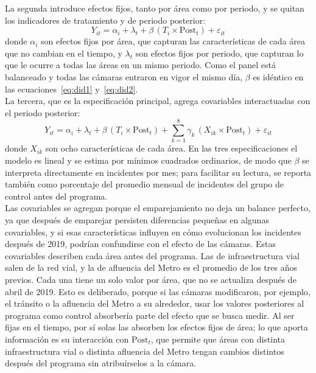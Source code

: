 La segunda introduce efectos fijos, tanto por área como por periodo, y se quitan los indicadores de tratamiento y de periodo posterior:
\begin{equation}
    Y_{it} = \alpha_i + \lambda_t + \beta \, (T_i \times \text{Post}_t) + \varepsilon_{it}
    \label{eq:did2}
\end{equation}
donde $\alpha_i$ son efectos fijos por área, que capturan las características de cada área que no cambian en el tiempo, y $\lambda_t$ son efectos fijos por periodo, que capturan lo que le ocurre a todas las áreas en un mismo periodo. Como el panel está balanceado y todas las cámaras entraron en vigor el mismo día, $\beta$ es idéntico en las ecuaciones~\eqref{eq:did1} y~\eqref{eq:did2}.\\

La tercera, que es la especificación principal, agrega covariables interactuadas con el periodo posterior:
\begin{equation}
    Y_{it} = \alpha_i + \lambda_t + \beta \, (T_i \times \text{Post}_t) + \sum_{k=1}^{8} \gamma_k \, (X_{ik} \times \text{Post}_t) + \varepsilon_{it}
    \label{eq:did}
\end{equation}
donde $X_{ik}$ son ocho características de cada área. En las tres especificaciones el modelo es lineal y se estima por mínimos cuadrados ordinarios, de modo que $\beta$ se interpreta directamente en incidentes por mes; para facilitar su lectura, se reporta también como porcentaje del promedio mensual de incidentes del grupo de control antes del programa.\\

Las covariables se agregan porque el emparejamiento no deja un balance perfecto, ya que después de emparejar persisten diferencias pequeñas en algunas covariables, y si esas características influyen en cómo evolucionan los incidentes después de 2019, podrían confundirse con el efecto de las cámaras. Estas covariables describen cada área antes del programa. Las de infraestructura vial salen de la red vial, y la de afluencia del Metro es el promedio de los tres años previos. Cada una tiene un solo valor por área, que no se actualiza después de abril de 2019. Esto es deliberado, porque si las cámaras modificaron, por ejemplo, el tránsito o la afluencia del Metro a su alrededor, usar los valores posteriores al programa como control absorbería parte del efecto que se busca medir. Al ser fijas en el tiempo, por sí solas las absorben los efectos fijos de área; lo que aporta información es su interacción con $\text{Post}_t$, que permite que áreas con distinta infraestructura vial o distinta afluencia del Metro tengan cambios distintos después del programa sin atribuírselos a la cámara.\\

